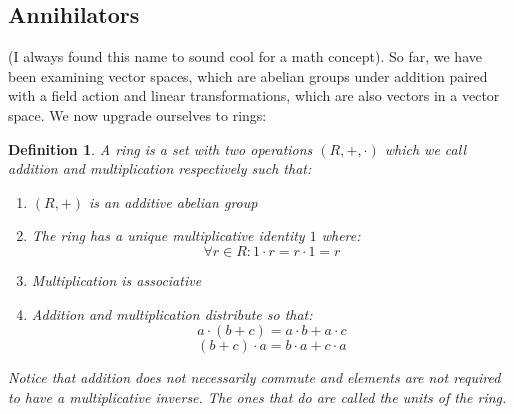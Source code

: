 \documentclass[10pt,letterpaper]{article} %
\newtheorem{defn}{Definition}[section]
\begin{document}
\subsection{Annihilators}
(I always found this name to sound cool for a math concept). So far, we have been examining vector spaces, which are abelian groups under addition paired with a field action
and linear transformations, which are also vectors in a vector space. We now upgrade ourselves to rings:
\begin{defn}
A ring is a set with two operations $(R, +, \cdot)$ which we call addition and multiplication respectively such that:
\begin{enumerate}
\item $(R, +)$ is an additive abelian group
\item The ring has a unique multiplicative identity $1$ where:
\begin{equation*}
\forall r \in R: 1 \cdot r = r \cdot 1 = r
\end{equation*}
\item Multiplication is associative
\item Addition and multiplication distribute so that:
\begin{equation*}
a \cdot (b + c) = a \cdot b + a \cdot c
\end{equation*}
\begin{equation*}
(b + c) \cdot a = b \cdot a + c \cdot a
\end{equation*}
\end{enumerate}
Notice that addition does not necessarily commute and elements are not required to have a multiplicative inverse. The ones that do are called the units of the ring.
\end{defn}
\end{document}
